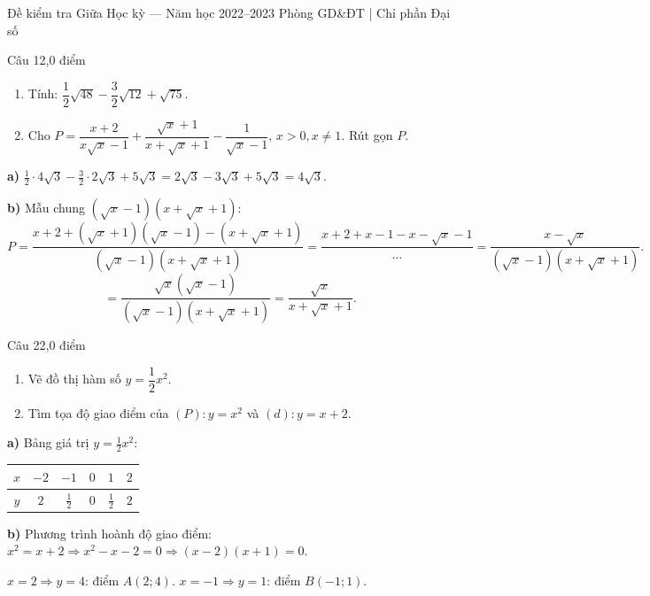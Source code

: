 ﻿%
%
  {Đề kiểm tra Giữa Học kỳ — Năm học 2022--2023}%
  {Phòng GD\&ĐT | Chỉ phần Đại số}

\begin{de_cau}{Câu 1}{2,0 điểm}
\begin{enumerate}[label=\alph*)]
\item Tính: $\dfrac{1}{2}\sqrt{48}-\dfrac{3}{2}\sqrt{12}+\sqrt{75}$.
\item Cho $P=\dfrac{x+2}{x\sqrt{x}-1}+\dfrac{\sqrt{x}+1}{x+\sqrt{x}+1}-\dfrac{1}{\sqrt{x}-1}$, $x>0, x\neq 1$.
Rút gọn $P$.
\end{enumerate}
\end{de_cau}

\begin{loi_giai_cau}
\textbf{a)} $\frac{1}{2}\cdot 4\sqrt{3} - \frac{3}{2}\cdot 2\sqrt{3} + 5\sqrt{3} = 2\sqrt{3}-3\sqrt{3}+5\sqrt{3} = 4\sqrt{3}$.

\textbf{b)} Mẫu chung $(\sqrt{x}-1)(x+\sqrt{x}+1)$:
\[P = \frac{x+2+(\sqrt{x}+1)(\sqrt{x}-1)-(x+\sqrt{x}+1)}{(\sqrt{x}-1)(x+\sqrt{x}+1)}
= \frac{x+2+x-1-x-\sqrt{x}-1}{\ldots} = \frac{x-\sqrt{x}}{(\sqrt{x}-1)(x+\sqrt{x}+1)}.\]
\[= \frac{\sqrt{x}(\sqrt{x}-1)}{(\sqrt{x}-1)(x+\sqrt{x}+1)} = \frac{\sqrt{x}}{x+\sqrt{x}+1}.\]
\end{loi_giai_cau}

\begin{de_cau}{Câu 2}{2,0 điểm}
\begin{enumerate}[label=\alph*)]
\item Vẽ đồ thị hàm số $y = \dfrac{1}{2}x^2$.
\item Tìm tọa độ giao điểm của $(P)\colon y=x^2$ và $(d)\colon y=x+2$.
\end{enumerate}
\end{de_cau}

\begin{loi_giai_cau}
\textbf{a)} Bảng giá trị $y=\frac{1}{2}x^2$:
\begin{center}
\begin{tabular}{c|ccccc}$x$&$-2$&$-1$&$0$&$1$&$2$\\\hline$y$&$2$&$\frac{1}{2}$&$0$&$\frac{1}{2}$&$2$\end{tabular}
\end{center}

\textbf{b)} Phương trình hoành độ giao điểm: $x^2=x+2\Rightarrow x^2-x-2=0\Rightarrow(x-2)(x+1)=0$.

$x=2\Rightarrow y=4$: điểm $A(2;4)$.
$x=-1\Rightarrow y=1$: điểm $B(-1;1)$.
\end{loi_giai_cau}

